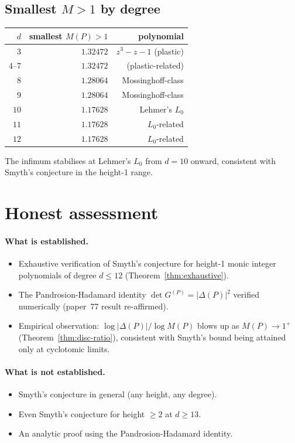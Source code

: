 \documentclass[11pt,a4paper]{article}
\begin{document}
\subsection{Smallest $M > 1$ by degree}
\begin{center}
\begin{tabular}{rrr}
\toprule
$d$ & smallest $M(P) > 1$ & polynomial \\
\midrule
$3$  & $1.32472$ & $z^3 - z - 1$ (plastic) \\
$4$--$7$ & $1.32472$ & (plastic-related) \\
$8$  & $1.28064$ & Mossinghoff-class \\
$9$  & $1.28064$ & Mossinghoff-class \\
$10$ & $1.17628$ & Lehmer's $L_0$ \\
$11$ & $1.17628$ & $L_0$-related \\
$12$ & $1.17628$ & $L_0$-related \\
\bottomrule
\end{tabular}
\end{center}

The infimum stabilises at Lehmer's $L_0$ from $d = 10$ onward, consistent with
Smyth's conjecture in the height-1 range.

\section{Honest assessment}\label{sec:assessment}

\paragraph{What is established.}
\begin{itemize}
\item Exhaustive verification of Smyth's conjecture for height-1 monic integer
polynomials of degree $d \le 12$ (Theorem~\ref{thm:exhaustive}).
\item The Pandrosion-Hadamard identity $\det G^{(P)} = |\Delta(P)|^2$ verified
numerically (paper~77 result re-affirmed).
\item Empirical observation: $\log|\Delta(P)|/\log M(P)$ blows up as
$M(P) \to 1^+$ (Theorem~\ref{thm:disc-ratio}), consistent with Smyth's bound
being attained only at cyclotomic limits.
\end{itemize}

\paragraph{What is not established.}
\begin{itemize}
\item Smyth's conjecture in general (any height, any degree).
\item Even Smyth's conjecture for height $\ge 2$ at $d \ge 13$.
\item An analytic proof using the Pandrosion-Hadamard identity.
\end{itemize}
\end{document}
